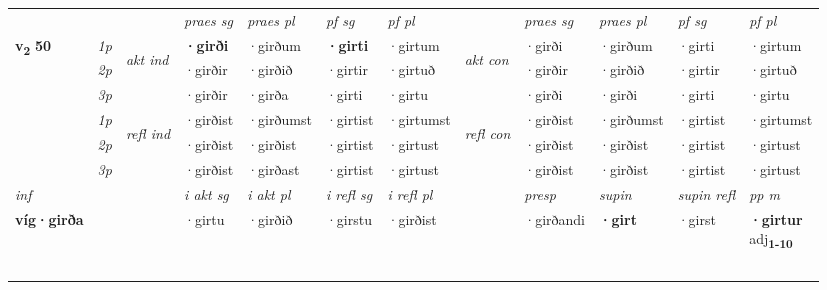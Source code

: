 \begin{longtable}[l]{X>{\footnotesize\itshape}llXXXXlXXXX}
 & &   & \textit{praes sg}  & \textit{praes pl}    & \textit{ pf sg} & \textit{pf pl} & & \textit{praes sg}  & \textit{praes pl}    & \textit{pf sg} & \textit{pf pl }  \\ \cmidrule{4-7} \cmidrule{9-12}
 \multirow{2}{*}{{{\textbf{v{\textsubscript{2}}} \Large{\textbf{50}}}}}  & 1p & \multirow{3}{*}{\begin{turn}{90}\textit{akt ind}\end{turn}} & \textbf{·girði} & ·girðum & \textbf{·girti} & ·girtum & \multirow{3}{*}{\begin{turn}{90}\textit{akt con}\end{turn}} &·girði & ·girðum & ·girti & ·girtum\\*
 & 2p &  &  ·girðir  & ·girðið & ·girtir & ·girtuð & & ·girðir & ·girðið & ·girtir & ·girtuð \\*
 & 3p &  & ·girðir & ·girða & ·girti & ·girtu & & ·girði & ·girði& ·girti & ·girtu \\*
\cmidrule{4-7} \cmidrule{9-12}
 & 1p & \multirow{3}{*}{\begin{turn}{90}\textit{refl ind}\end{turn}}  & ·girðist & ·girðumst & ·girtist & ·girtumst & \multirow{3}{*}{\begin{turn}{90}\textit{refl con}\end{turn}}  &·girðist & ·girðumst & ·girtist & ·girtumst \\*
 & 2p &  & ·girðist & ·girðist & ·girtist & ·girtust & &·girðist & ·girðist & ·girtist & ·girtust \\*
 & 3p  & & ·girðist & ·girðast & ·girtist & ·girtust & & ·girðist & ·girðist& ·girtist & ·girtust \\*
\cmidrule{4-7} \cmidrule{9-12}

   {\textit{inf}} & &  & \textit{i akt sg} & \textit{i akt pl} & \textit{i refl sg} & \textit{i refl pl} && \textit{presp} & \textit{supin} & \textit{supin refl} & \textit{pp m} \\*
  {\textbf{víg\allowbreak ·girða}} & && ·girtu  & ·girðið & ·girstu & ·girðist && ·girðandi &  \textbf{·girt} & ·girst & \specialcell{\textbf{·girtur} \\ adj\textbf{\textsubscript{1-10}}} \\*

\midrule
 & \\*
   & \\*
   & \\*
   & \\*
  & \\
   \midrule


\end{longtable}
